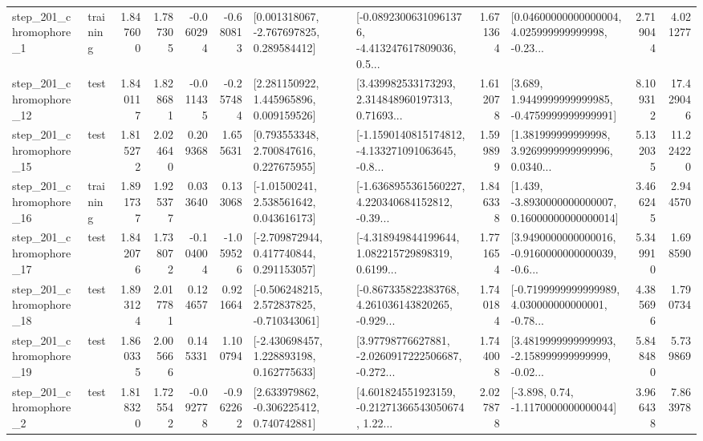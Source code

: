 \begin{tabular}{llrrrrllrlrr}
   step\_201\_chromophore\_1 &  training &      1.847600 &    1.787305 &     -0.060294 & -0.680813 &    [0.001318067, -2.767697825, 0.289584412] &  [-0.08923006310961376, -4.413247617809036, 0.5... &       1.671364 &  [0.04600000000000004, 4.025999999999998, -0.23... &            2.719044 &          4.021277 \\
  step\_201\_chromophore\_12 &      test &      1.840117 &    1.828681 &     -0.011435 & -0.257484 &     [2.281150922, 1.445965896, 0.009159526] &  [3.439982533173293, 2.314848960197313, 0.71693... &       1.612078 &   [3.689, 1.9449999999999985, -0.4759999999999991] &            8.109312 &         17.429046 \\
  step\_201\_chromophore\_15 &      test &      1.815272 &    2.024640 &      0.209368 &  1.655631 &     [0.793553348, 2.700847616, 0.227675955] &  [-1.1590140815174812, -4.133271091063645, -0.8... &       1.599899 &  [1.381999999999998, 3.9269999999999996, 0.0340... &            5.132035 &         11.224220 \\
  step\_201\_chromophore\_16 &  training &      1.891737 &    1.925377 &      0.033640 &  0.133068 &     [-1.01500241, 2.538561642, 0.043616173] &  [-1.6368955361560227, 4.220340684152812, -0.39... &       1.846338 &  [1.439, -3.8930000000000007, 0.16000000000000014] &            3.466245 &          2.944570 \\
  step\_201\_chromophore\_17 &      test &      1.842076 &    1.738072 &     -0.104004 & -1.059526 &    [-2.709872944, 0.417740844, 0.291153057] &  [-4.318949844199644, 1.082215729898319, 0.6199... &       1.771654 &  [3.9490000000000016, -0.9160000000000039, -0.6... &            5.349910 &          1.698590 \\
  step\_201\_chromophore\_18 &      test &      1.893124 &    2.017781 &      0.124657 &  0.921664 &   [-0.506248215, 2.572837825, -0.710343061] &  [-0.867335822383768, 4.261036143820265, -0.929... &       1.740184 &  [-0.7199999999999989, 4.030000000000001, -0.78... &            4.385696 &          1.790734 \\
  step\_201\_chromophore\_19 &      test &      1.860335 &    2.005666 &      0.145331 &  1.100794 &    [-2.430698457, 1.228893198, 0.162775633] &  [3.97798776627881, -2.0260917222506687, -0.272... &       1.744008 &  [3.4819999999999993, -2.158999999999999, -0.02... &            5.848480 &          5.739869 \\
   step\_201\_chromophore\_2 &      test &      1.818320 &    1.725542 &     -0.092778 & -0.962262 &    [2.633979862, -0.306225412, 0.740742881] &  [4.601824551923159, -0.21271366543050674, 1.22... &       2.027878 &                [-3.898, 0.74, -1.1170000000000044] &            3.966438 &          7.863978 \\

\end{tabular}
